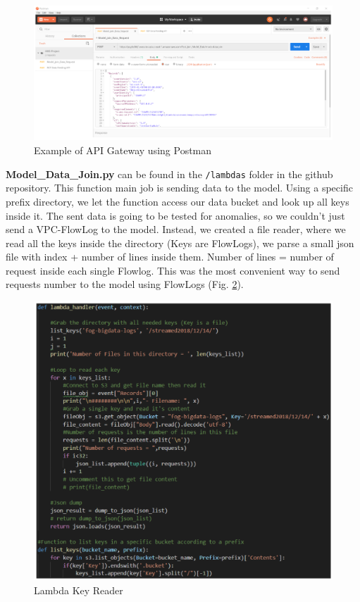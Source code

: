 \begin{figure}[h!]
    \includegraphics[width=1\textwidth]{images/api-gateway.png}
    \caption{Example of API Gateway using Postman}
    \label{fig:api_gateway}
\end{figure}

\textbf{Model\_Data\_Join.py} can be found in the \verb|/lambdas| folder in the github repository.
This function main job is sending data to the model. Using a specific prefix directory, we let the function access our data bucket and look up all keys inside it. The sent data is going to be tested for anomalies, so we couldn't just send a VPC-FlowLog to the model. Instead, we created a file reader, where we read all the keys inside the directory (Keys are FlowLogs), we parse a small json file with index + number of lines inside them. Number of lines = number of request inside each single Flowlog. This was the most convenient way to send requests number to the model using FlowLogs (Fig. \ref{fig:lambda_key_reader}).

\begin{figure}[h!]
    \centering
    \includegraphics[width=1\textwidth]{images/lambda-key-reader.png}
    \caption{Lambda Key Reader}
    \label{fig:lambda_key_reader}
\end{figure}


